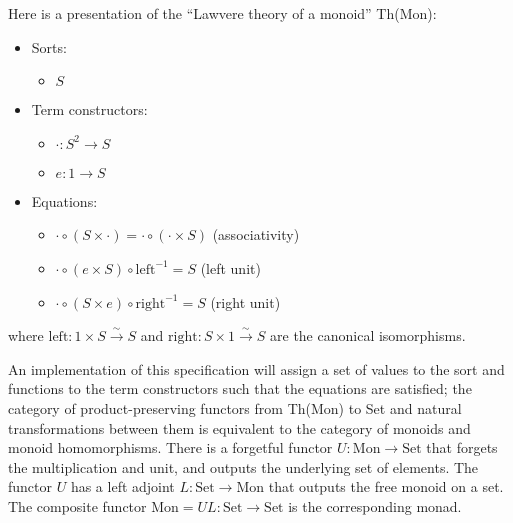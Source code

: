 \documentclass{article}
\newcommand{\maps}{\colon}
\newcommand{\Set}{\mathrm{Set}}
\newcommand{\Mon}{\mathrm{Mon}}
\renewcommand{\left}{\mathrm{left}}
\renewcommand{\right}{\mathrm{right}}
\begin{document}
Here is a presentation of the ``Lawvere theory of a monoid'' Th(Mon):\\
\begin{center}
  \begin{itemize}
    \item Sorts:
    \begin{itemize}
      \item $S$
    \end{itemize}
    \item Term constructors:
    \begin{itemize}
      \item $\cdot\maps S^2 \to S$
      \item $e\maps 1 \to S$
    \end{itemize}
    \item Equations:
    \begin{itemize}
      \item $\cdot \circ (S \times \cdot) = \cdot \circ (\cdot \times S)$ (associativity)
      \item $\cdot \circ (e \times S) \circ \left^{-1} = S$ (left unit)
      \item $\cdot \circ (S \times e) \circ \right^{-1} = S$ (right unit)        
    \end{itemize}
  \end{itemize}
\end{center}
where ${\left\maps 1 \times S \stackrel{\sim}{\to} S}$ and ${\right\maps S \times 1 \stackrel{\sim}{\to} S}$ are the canonical isomorphisms.

An implementation of this specification will assign a set of values to the sort and functions to the term constructors such that the equations are satisfied; the category of product-preserving functors from Th(Mon) to Set and natural transformations between them is equivalent to the category of monoids and monoid homomorphisms.  There is a forgetful functor $U\maps \Mon \to \Set$ that forgets the multiplication and unit, and outputs the underlying set of elements.  The functor $U$ has a left adjoint $L\maps \Set \to \Mon$ that outputs the free monoid on a set.  The composite functor $\Mon = UL\maps \Set \to \Set$ is the corresponding monad.
\end{document}
